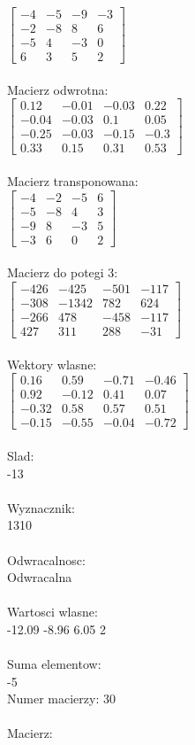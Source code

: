 \documentclass[a4paper,12pt]{article}
\begin{document}
$\begin{bmatrix} -4&-5&-9&-3\\-2&-8&8&6\\-5&4&-3&0\\6&3&5&2 \end{bmatrix}$
\\
\\
Macierz odwrotna:\\

$\begin{bmatrix} 0.12&-0.01&-0.03&0.22\\-0.04&-0.03&0.1&0.05\\-0.25&-0.03&-0.15&-0.3\\0.33&0.15&0.31&0.53 \end{bmatrix}$
\\
\\
Macierz transponowana:\\

$\begin{bmatrix} -4&-2&-5&6\\-5&-8&4&3\\-9&8&-3&5\\-3&6&0&2 \end{bmatrix}$
\\
\\
Macierz do potegi 3:\\

$\begin{bmatrix} -426&-425&-501&-117\\-308&-1342&782&624\\-266&478&-458&-117\\427&311&288&-31 \end{bmatrix}$
\\
\\
Wektory wlasne:\\

$\begin{bmatrix} 0.16&0.59&-0.71&-0.46\\0.92&-0.12&0.41&0.07\\-0.32&0.58&0.57&0.51\\-0.15&-0.55&-0.04&-0.72 \end{bmatrix}$
\\
\\
Slad:\\
-13
\\
\\
Wyznacznik:\\
1310
\\
\\
Odwracalnosc:\\
Odwracalna
\\
\\
Wartosci wlasne:\\
-12.09 -8.96 6.05 2
\\
\\
Suma elementow:\\
-5
\\
\newpage
Numer macierzy:
30
\\
\\
Macierz:\\
\end{document}
